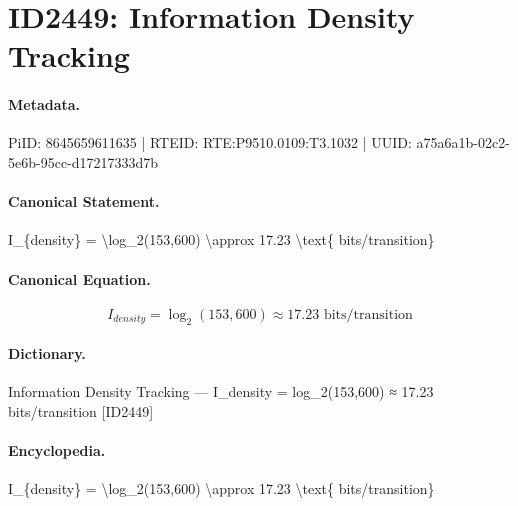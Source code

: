 \section*{ID2449: Information Density Tracking}
\paragraph{Metadata.}
PiID: 8645659611635 | RTEID: RTE:P9510.0109:T3.1032 | UUID: a75a6a1b-02c2-5e6b-95cc-d17217333d7b

\paragraph{Canonical Statement.}
I\_\{density\} = \textbackslash{}log\_2(153,600) \textbackslash{}approx 17.23 \textbackslash{}text\{ bits/transition\}

\paragraph{Canonical Equation.}
\[
I_{density} = \log_2(153,600) \approx 17.23 \text{ bits/transition}
\]

\paragraph{Dictionary.}
Information Density Tracking — I\_density = log\_2(153,600) ≈ 17.23 bits/transition [ID2449]

\paragraph{Encyclopedia.}
I\_\{density\} = \textbackslash{}log\_2(153,600) \textbackslash{}approx 17.23 \textbackslash{}text\{ bits/transition\}
